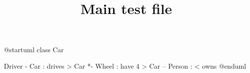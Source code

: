 \documentclass{article}
\title{Main test file}
\begin{document}
\lipsum[1]

\begin{plantuml}[width=0.8\textwidth]
@startuml
class Car

Driver - Car : drives >
Car *- Wheel : have 4 >
Car -- Person : < owns
@enduml
\end{plantuml}

\lipsum[2]

\end{document}
